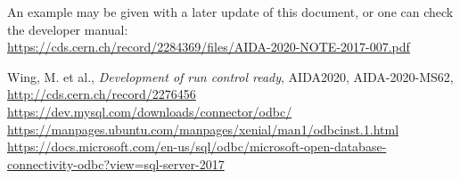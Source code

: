 \documentclass[a4paper,12pt]{scrartcl}
\begin{document}
An example may be given with a later update of this document, or one can check the developer manual:\\
\indent \href{https://cds.cern.ch/record/2284369/files/AIDA-2020-NOTE-2017-007.pdf}{\footnotesize{https://cds.cern.ch/record/2284369/files/AIDA-2020-NOTE-2017-007.pdf}}

\clearpage
%
\begin{thebibliography}{1}
 Wing, M. et al., {\em Development of run control ready}, AIDA2020, AIDA-2020-MS62, \href{http://cds.cern.ch/record/2276456}{http://cds.cern.ch/record/2276456}
 \href{https://dev.mysql.com/downloads/connector/odbc/}{https://dev.mysql.com/downloads/connector/odbc/}
 \href{https://manpages.ubuntu.com/manpages/xenial/man1/odbcinst.1.html}{https://manpages.ubuntu.com/manpages/xenial/man1/odbcinst.1.html}
 \href{https://docs.microsoft.com/en-us/sql/odbc/microsoft-open-database-connectivity-odbc?view=sql-server-2017}{https://docs.microsoft.com/en-us/sql/odbc/microsoft-open-database-connectivity-odbc?view=sql-server-2017}

\end{thebibliography}

\end{document}
